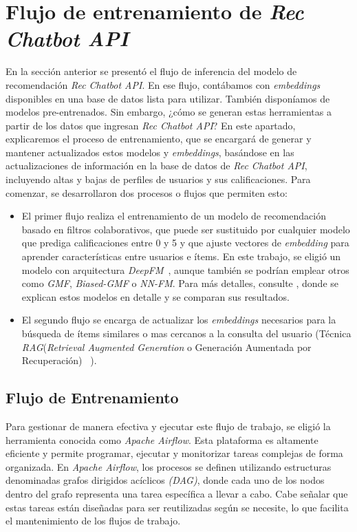 \documentclass[11pt,a4paper,twoside]{thesis}
\begin{document}
\vfill
\chapter{Flujo de entrenamiento de \textit{Rec Chatbot API}}

En la sección anterior se presentó el flujo de inferencia del modelo de recomendación \textit{Rec Chatbot API}. En ese flujo, contábamos con \textit{embeddings} disponibles en una base de datos lista para utilizar. También disponíamos de modelos pre-entrenados. Sin embargo, ¿cómo se generan estas herramientas a partir de los datos que ingresan \textit{Rec Chatbot API}? En este apartado, explicaremos el proceso de entrenamiento, que se encargará de generar y mantener actualizados estos modelos y \textit{embeddings}, basándose en las actualizaciones de información en la base de datos de \textit{Rec Chatbot API}, incluyendo altas y bajas de perfiles de usuarios y sus calificaciones. Para comenzar, se desarrollaron dos procesos o flujos que permiten esto:

\begin{itemize}
	\item El primer flujo realiza el entrenamiento de un modelo de recomendación basado en filtros colaborativos, que puede ser sustituido por cualquier modelo que prediga calificaciones entre 0 y 5 y que ajuste vectores de \textit{embedding} para aprender características entre usuarios e ítems. En este trabajo, se eligió un modelo con arquitectura \textit{DeepFM}~\cite{dfmpaper, didldfm}, aunque también se podrían emplear otros como \textit{GMF}, \textit{Biased-GMF} o \textit{NN-FM}. Para más detalles, consulte \cite{src}, donde se explican estos modelos en detalle y se comparan sus resultados.
	\item El segundo flujo se encarga de actualizar los \textit{embeddings} necesarios para la búsqueda de ítems similares o mas cercanos a la consulta del usuario (Técnica \textit{RAG}(\textit{Retrieval Augmented Generation} o Generación Aumentada por Recuperación) ~\cite{rag}).
\end{itemize}


\section{Flujo de Entrenamiento}

Para gestionar de manera efectiva y ejecutar este flujo de trabajo, se eligió la herramienta conocida como \textit{Apache Airflow}. Esta plataforma es altamente eficiente y permite programar, ejecutar y monitorizar tareas complejas de forma organizada. En \textit{Apache Airflow}, los procesos se definen utilizando estructuras denominadas grafos dirigidos acíclicos \textit{(DAG)}, donde cada uno de los nodos dentro del grafo representa una tarea específica a llevar a cabo. Cabe señalar que estas tareas están diseñadas para ser reutilizadas según se necesite, lo que facilita el mantenimiento de los flujos de trabajo.
\end{document}
